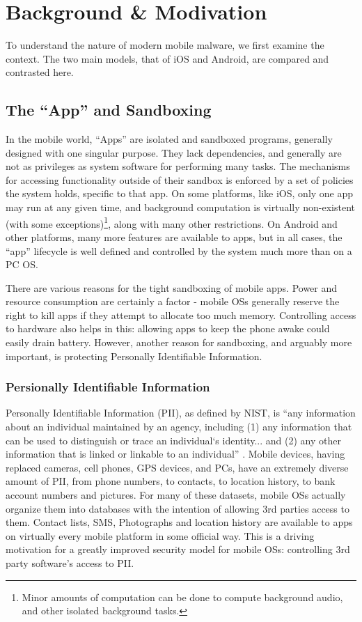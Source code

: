 \chapter{Background \& Modivation}
\label{sec:background}

To understand the nature of modern mobile malware, we first examine the context. The two main models, that of iOS and Android, are compared and contrasted here.

\section{The ``App'' and Sandboxing}

In the mobile world, ``Apps'' are isolated and sandboxed programs, generally designed with one singular purpose. They lack dependencies, and generally are not as privileges as system software for performing many tasks. The mechanisms for accessing functionality outside of their sandbox is enforced by a set of policies the system holds, specific to that app. On some platforms, like iOS, only one app may run at any given time, and background computation is virtually non-existent (with some exceptions)\footnote{Minor amounts of computation can be done to compute background audio, and other isolated background tasks.}, along with many other restrictions. On Android and other platforms, many more features are available to apps, but in all cases, the ``app'' lifecycle is well defined and controlled by the system much more than on a PC OS.

There are various reasons for the tight sandboxing of mobile apps. Power and resource consumption are certainly a factor - mobile OSs generally reserve the right to kill apps if they attempt to allocate too much memory. Controlling access to hardware also helps in this: allowing apps to keep the phone awake could easily drain battery. However, another reason for sandboxing, and arguably more important, is protecting Personally Identifiable Information.

\subsection{Persionally Identifiable Information}

Personally Identifiable Information (PII), as defined by NIST, is ``any information about an individual maintained by an agency, including (1) any information that can be used to distinguish or trace an individual‘s identity... and (2) any other information that is linked or linkable to an individual'' \citep{mccallister2010guide}. Mobile devices, having replaced cameras, cell phones, GPS devices, and PCs, have an extremely diverse amount of PII, from phone numbers, to contacts, to location history, to bank account numbers and pictures. For many of these datasets, mobile OSs actually organize them into databases with the intention of allowing 3rd parties access to them. Contact lists, SMS, Photographs and location history are available to apps on virtually every mobile platform in some official way. This is a driving motivation for a greatly improved security model for mobile OSs: controlling 3rd party software's access to PII. 

